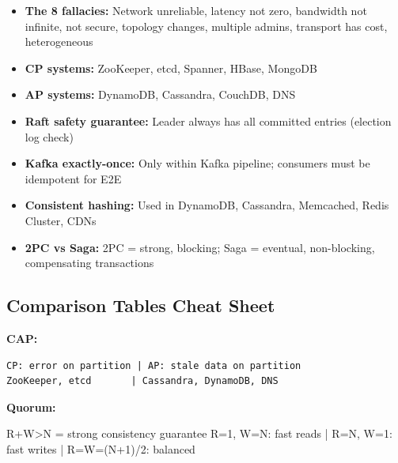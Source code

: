 \documentclass[11pt]{article}
\providecommand{\tightlist}{\setlength{\itemsep}{1pt}\setlength{\parskip}{0pt}}
\newenvironment{Shaded}{\begin{snugshade}}{\end{snugshade}}
\newcommand{\DecValTok}[1]{\textcolor[rgb]{0.96,0.45,0.00}{#1}}
\newcommand{\NormalTok}[1]{\textcolor[rgb]{0.81,0.81,0.76}{#1}}
\newcommand{\OperatorTok}[1]{\textcolor[rgb]{0.81,0.81,0.76}{#1}}
\begin{document}
\begin{itemize}
\tightlist
\item
  \textbf{The 8 fallacies:} Network unreliable, latency not zero, bandwidth not infinite, not secure, topology changes, multiple admins, transport has cost, heterogeneous
\item
  \textbf{CP systems:} ZooKeeper, etcd, Spanner, HBase, MongoDB
\item
  \textbf{AP systems:} DynamoDB, Cassandra, CouchDB, DNS
\item
  \textbf{Raft safety guarantee:} Leader always has all committed entries (election log check)
\item
  \textbf{Kafka exactly-once:} Only within Kafka pipeline; consumers must be idempotent for E2E
\item
  \textbf{Consistent hashing:} Used in DynamoDB, Cassandra, Memcached, Redis Cluster, CDNs
\item
  \textbf{2PC vs Saga:} 2PC = strong, blocking; Saga = eventual, non-blocking, compensating transactions
\end{itemize}

\subsection{Comparison Tables Cheat Sheet}\label{comparison-tables-cheat-sheet}

\textbf{CAP:}

\setcodelang{}

\begin{verbatim}
CP: error on partition | AP: stale data on partition
ZooKeeper, etcd       | Cassandra, DynamoDB, DNS
\end{verbatim}

\textbf{Quorum:}


\begin{Shaded}
\begin{Highlighting}[]
\NormalTok{R}\OperatorTok{+}\NormalTok{W}\OperatorTok{\textgreater{}}\NormalTok{N }\OperatorTok{=}\NormalTok{ strong consistency guarantee}
\NormalTok{R}\OperatorTok{=}\DecValTok{1}\NormalTok{, W}\OperatorTok{=}\NormalTok{N: fast reads }\OperatorTok{|}\NormalTok{ R}\OperatorTok{=}\NormalTok{N, W}\OperatorTok{=}\DecValTok{1}\NormalTok{: fast writes }\OperatorTok{|}\NormalTok{ R}\OperatorTok{=}\NormalTok{W}\OperatorTok{=}\NormalTok{(N}\OperatorTok{+}\DecValTok{1}\NormalTok{)}\OperatorTok{/}\DecValTok{2}\NormalTok{: balanced}
\end{Highlighting}
\end{Shaded}
\end{document}
